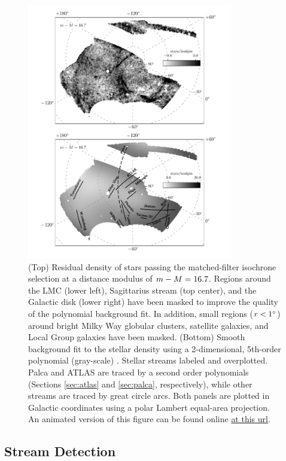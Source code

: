 \documentclass[twocolumn]{aastex61}
\begin{document}
\begin{figure}[ht!]
  \centering
  \includegraphics[width=0.8\textwidth]{residual_bkg_m16p7_v17p2}
  \caption{(Top) Residual density of stars passing the matched-filter isochrone selection at a distance modulus of $m - M = 16.7$. 
Regions around the LMC (lower left), Sagittarius stream (top center), and the Galactic disk (lower right) have been masked to improve the quality of the polynomial background fit. 
In addition, small regions ($r < 1{}^{\circ}$) around bright Milky Way globular clusters, satellite galaxies, and Local Group galaxies have been masked.
    (Bottom) Smooth background fit to the stellar density using a 2-dimensional, 5th-order polynomial (gray-scale) .
Stellar streams labeled and overplotted.
Palca and ATLAS are traced by a second order polynomials (Sections \ref{sec:atlas} and \ref{sec:palca}, respectively), while other streams are traced by great circle arcs.
    Both panels are plotted in Galactic coordinates using a polar Lambert equal-area projection.
    An animated version of this figure can be found online \href{http://home.fnal.gov/~kadrlica/movies/residual_bkg_v17p2.gif}{at this url}.
}
  \label{fig:isosel2}
\end{figure}

\subsection{Stream Detection}
\label{sec:detect}
\end{document}
